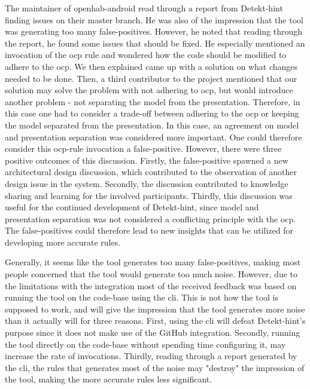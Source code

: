 \documentclass[pdftex,10pt,b5paper,twoside]{report}
\begin{document}
The maintainer of openhab-android\cite{openhab} read through a report from Detekt-hint finding issues on their master branch. He was also of the impression that the tool was generating too many false-positives. However, he noted that reading through the report, he found some issues that should be fixed. He especially mentioned an invocation of the \gls{ocp} rule and wondered how the code should be modified to adhere to the \gls{ocp}. We then explained came up with a solution on what changes needed to be done. Then, a third contributor to the project mentioned that our solution may solve the problem with not adhering to \gls{ocp}, but would introduce another problem - not separating the model from the presentation. Therefore, in this case one had to consider a trade-off between adhering to the \gls{ocp} or keeping the model separated from the presentation. In this case, an agreement on model and presentation separation was considered more important. One could therefore consider this \gls{ocp}-rule invocation a false-positive.  However, there were three positive outcomes of this discussion. Firstly, the false-positive spawned a new architectural design discussion, which contributed to the observation of another design issue in the system. Secondly, the discussion contributed to knowledge sharing and learning for the involved participants.
Thirdly, this discussion was useful for the continued development of Detekt-hint, since model and presentation separation was not considered a conflicting principle with the \gls{ocp}. The false-positives could therefore lead to new insights that can be utilized for developing more accurate rules. 

Generally, it seems like the tool generates too many false-positives, making most people concerned that the tool would generate too much noise. However, due to the limitations with the integration most of the received feedback was based on running the tool on the code-base using the \gls{cli}. This is not how the tool is supposed to work, and will give the impression that the tool generates more noise than it actually will for three reasons. First, using the \gls{cli} will defeat Detekt-hint's purpose since it does not make use of the GitHub integration. Secondly, running the tool directly on the code-base without spending time configuring it, may increase the rate of invocations. Thirdly, reading through a report generated by the \gls{cli}, the rules that generates most of the noise may "destroy" the impression of the tool, making the more accurate rules less significant. 
\end{document}
